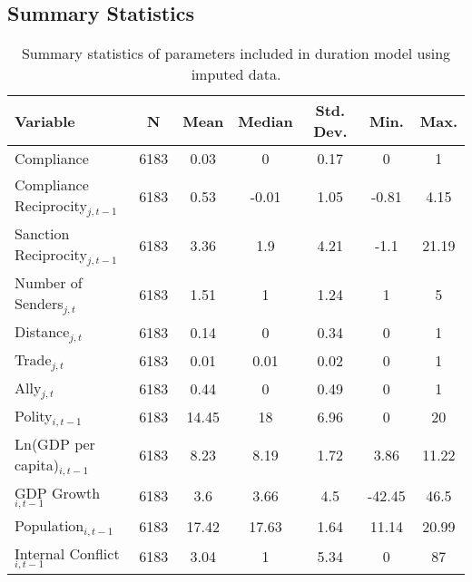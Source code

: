 \subsection*{Summary Statistics}
\begin{table}[ht]
\centering
{\normalsize
\begin{tabular}{lcccccc}
 Variable & N & Mean & Median & Std. Dev. & Min. & Max. \\ 
  \hline
\hline
Compliance & 6183 & 0.03 & 0 & 0.17 & 0 & 1 \\ 
  Compliance Reciprocity$_{j,t-1}$ & 6183 & 0.53 & -0.01 & 1.05 & -0.81 & 4.15 \\ 
  Sanction Reciprocity$_{j,t-1}$ & 6183 & 3.36 & 1.9 & 4.21 & -1.1 & 21.19 \\ 
  Number of Senders$_{j,t}$ & 6183 & 1.51 & 1 & 1.24 & 1 & 5 \\ 
  Distance$_{j,t}$ & 6183 & 0.14 & 0 & 0.34 & 0 & 1 \\ 
  Trade$_{j,t}$ & 6183 & 0.01 & 0.01 & 0.02 & 0 & 1 \\ 
  Ally$_{j,t}$ & 6183 & 0.44 & 0 & 0.49 & 0 & 1 \\ 
  Polity$_{i,t-1}$ & 6183 & 14.45 & 18 & 6.96 & 0 & 20 \\ 
  Ln(GDP per capita)$_{i,t-1}$ & 6183 & 8.23 & 8.19 & 1.72 & 3.86 & 11.22 \\ 
  GDP Growth$_{i,t-1}$ & 6183 & 3.6 & 3.66 & 4.5 & -42.45 & 46.5 \\ 
  Population$_{i,t-1}$ & 6183 & 17.42 & 17.63 & 1.64 & 11.14 & 20.99 \\ 
  Internal Conflict$_{i,t-1}$ & 6183 & 3.04 & 1 & 5.34 & 0 & 87 \\ 
   \hline
\hline
\end{tabular}
}
\caption{Summary statistics of parameters included in duration model using imputed data.} 
\label{tab:summImp}
\end{table}
